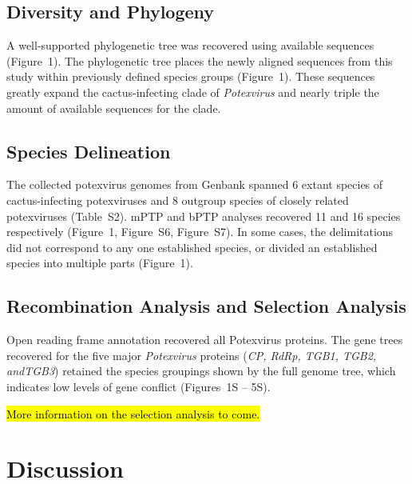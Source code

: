 \documentclass[fleqn,10pt,lineno]{wlpeerj}
\begin{document}
\subsection*{Diversity and Phylogeny}
A well-supported phylogenetic tree was recovered using available sequences (Figure~1).
The phylogenetic tree places the newly aligned sequences from this study within previously defined species groups (Figure~1).
These sequences greatly expand the cactus-infecting clade of \textit{Potexvirus} and nearly triple the amount of available sequences for the clade. 

\subsection*{Species Delineation}
The collected potexvirus genomes from Genbank spanned 6 extant species of cactus-infecting potexviruses and 8 outgroup species of closely related potexviruses (Table~S2).
mPTP and bPTP analyses recovered 11 and 16 species respectively (Figure~1, Figure~S6, Figure~S7).
In some cases, the delimitations did not correspond to any one established species, or divided an established species into multiple parts (Figure~1).

\subsection*{Recombination Analysis and Selection Analysis}
Open reading frame annotation recovered all Potexvirus proteins.
The gene trees recovered for the five major \textit{Potexvirus} proteins (\textit{CP, RdRp, TGB1, TGB2, \textit{and}TGB3}) retained the species groupings shown by the full genome tree, which indicates low levels of gene conflict (Figures~1S -- 5S).

\hl{More information on the selection analysis to come.}


\section*{Discussion}
\end{document}
